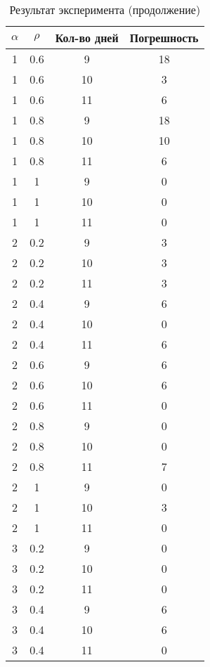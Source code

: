 \begin{table}[h!]
	\begin{center}
		\caption{\label{tabular:exp2}Результат эксперимента (продолжение)}
		\begin{tabular}{|c|c|c|c|}
			\hline
			$\alpha$ & $\rho$ & Кол-во дней & Погрешность 	\\\hline
    1 &   0.6 &     9 &    18 \\ \hline 
1 &   0.6 &    10 &     3 \\ \hline 
1 &   0.6 &    11 &     6 \\ \hline 
1 &   0.8 &     9 &    18 \\ \hline 
1 &   0.8 &    10 &    10 \\ \hline 
1 &   0.8 &    11 &     6 \\ \hline 
1 &     1 &     9 &     0 \\ \hline 
1 &     1 &    10 &     0 \\ \hline 
1 &     1 &    11 &     0 \\ \hline 
2 &   0.2 &     9 &     3 \\ \hline 
2 &   0.2 &    10 &     3 \\ \hline 
2 &   0.2 &    11 &     3 \\ \hline 
2 &   0.4 &     9 &     6 \\ \hline 
2 &   0.4 &    10 &     0 \\ \hline 
2 &   0.4 &    11 &     6 \\ \hline 
2 &   0.6 &     9 &     6 \\ \hline 
2 &   0.6 &    10 &     6 \\ \hline 
2 &   0.6 &    11 &     0 \\ \hline 
2 &   0.8 &     9 &     0 \\ \hline 
2 &   0.8 &    10 &     0 \\ \hline 
2 &   0.8 &    11 &     7 \\ \hline 
2 &     1 &     9 &     0 \\ \hline 
2 &     1 &    10 &     3 \\ \hline 
2 &     1 &    11 &     0 \\ \hline 
3 &   0.2 &     9 &     0 \\ \hline 
3 &   0.2 &    10 &     0 \\ \hline 
3 &   0.2 &    11 &     0 \\ \hline 
3 &   0.4 &     9 &     6 \\ \hline 
3 &   0.4 &    10 &     6 \\ \hline 
3 &   0.4 &    11 &     0 \\ \hline 

\end{tabular}
\end{center}
\end{table}

